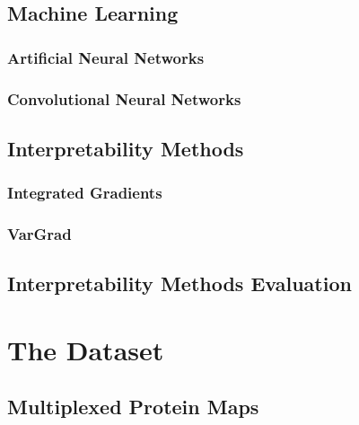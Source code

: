 \documentclass[biblatexBackend=bibtex]{tumthesis}
\begin{document}
\section{Machine Learning}

\label{sec:basics:ANN}
\subsection{Artificial Neural Networks}


\subsection{Convolutional Neural Networks}
\label{sec:basics:CNN}


\section{Interpretability Methods}
\label{sec:basics:interpretability_methods}


\subsection{Integrated Gradients}
\label{sec:basics:IG}


\subsection{VarGrad}
\label{sec:basics:VarGrad}


\section{Interpretability Methods Evaluation}
\label{sec:basics:vgig_eval}

\chapter{The Dataset}
\label{ch:dataset}


\section{Multiplexed Protein Maps}
\label{sec:dataset:multiplexed_protein_maps}

\end{document}
